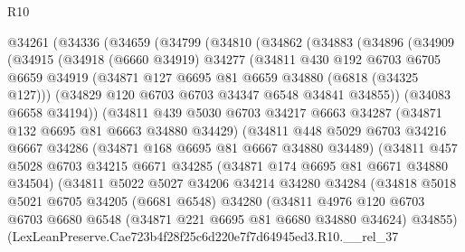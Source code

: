 \begin{lexlean}{R10}
\begin{coremodule}
  @34261
    (@34336
      (@34659
        (@34799
          (@34810
            (@34862
              (@34883
                (@34896
                  (@34909
                    (@34915
                      (@34918
                        (@6660 @34919)
                        @34277
                        (@34811
                          @430
                          @192
                          @6703
                          @6705
                          @6659
                          @34919
                          (@34871 @127 @6695 @81 @6659 @34880 (@6818 (@34325 @127)))
                          (@34829 @120 @6703 @6703 @34347 @6548 @34841 @34855))
                        (@34083 @6658 @34194))
                      (@34811
                        @439
                        @5030
                        @6703
                        @34217
                        @6663
                        @34287
                        (@34871 @132 @6695 @81 @6663 @34880 @34429)
                        (@34811
                          @448
                          @5029
                          @6703
                          @34216
                          @6667
                          @34286
                          (@34871 @168 @6695 @81 @6667 @34880 @34489)
                          (@34811
                            @457
                            @5028
                            @6703
                            @34215
                            @6671
                            @34285
                            (@34871 @174 @6695 @81 @6671 @34880 @34504)
                            (@34811
                              @5022
                              @5027
                              @34206
                              @34214
                              @34280
                              @34284
                              (@34818
                                @5018
                                @5021
                                @6705
                                @34205
                                (@6681 @6548)
                                @34280
                                (@34811
                                  @4976
                                  @120
                                  @6703
                                  @6703
                                  @6680
                                  @6548
                                  (@34871 @221 @6695 @81 @6680 @34880 @34624)
                                  @34855)
                                (LexLeanPreserve.Cae723b4f28f25c6d220e7f7d64945ed3.R10.__rel_37

\end{coremodule}
\end{lexlean}

